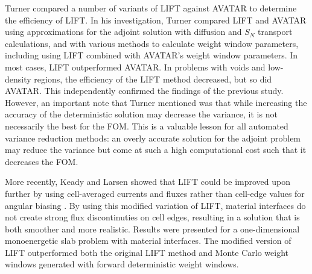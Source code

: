 Turner compared a number of variants of LIFT \cite{turner_automatic_1997-1}
against AVATAR to
determine the efficiency of LIFT. In his investigation, Turner compared LIFT and
AVATAR using
approximations for the adjoint solution with diffusion and $S_N$ transport
calculations, and with
various methods to calculate weight window parameters, including using LIFT
combined
with AVATAR's weight window parameters. In most cases, LIFT outperformed AVATAR.
In problems
with voids and low-density regions, the efficiency of the LIFT method decreased,
but so did
AVATAR. This independently confirmed the findings of the previous study.
However, an important note that Turner mentioned was that while
increasing the
accuracy of the deterministic solution may decrease the variance, it is not
necessarily the
best for the FOM. This is a valuable lesson for all automated variance reduction
methods: an
overly accurate solution for the adjoint problem may reduce the variance but
come at such
a high computational cost such that it decreases the FOM.

More recently, Keady and Larsen showed that LIFT could be improved upon further
by using cell-averaged currents and fluxes rather than cell-edge values for
angular biasing \cite{keady_modified_2015}. By using this modified variation of
LIFT, material interfaces do not create strong flux discontinuties on cell
edges, resulting in a solution that is both smoother and more realistic.
Results were presented for a
one-dimensional monoenergetic slab problem with material interfaces. The
modified version of LIFT outperformed both the original LIFT method and
Monte Carlo
weight windows generated with forward deterministic weight windows.


